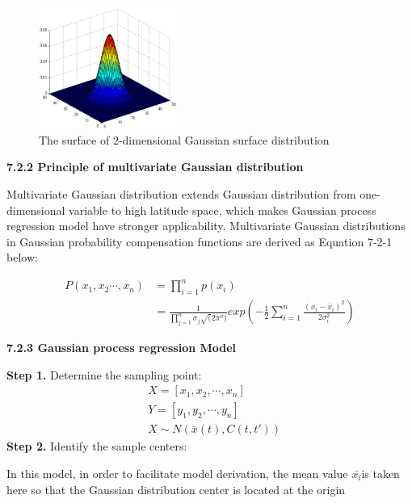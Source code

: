 \documentclass{apmcmthesis}
\begin{document}
		\begin{figure}[htbp!]
		\centering
		\includegraphics[height=4cm]{./figures/7-4.png}
		\caption{The surface of 2-dimensional Gaussian surface distribution
		}
	\end{figure}	
	
	\noindent\textbf{7.2.2 Principle of multivariate Gaussian distribution}
	
	Multivariate Gaussian distribution extends Gaussian distribution from one-dimensional variable to high latitude space, which makes Gaussian process regression model have stronger applicability. Multivariate Gaussian distributions in Gaussian probability compensation functions are derived as Equation 7-2-1 below:
	
	\begin{equation}
		\tag{7-2-1}
		\begin{split}
			P(x_{1},x_{2}\cdots,x_{n})& =\prod_{i=1}^{n}p(x_{i}) \\ &=\frac{1}{\prod_{j=1}^{n}\sigma_{j}\sqrt(2\pi^{\pi})}exp(-\frac{1}{2}\sum_{i=1}^{n}\frac{(x_{i}-\bar{x}_{i})^2}{2\sigma^2_{i}})
		\end{split}
	\end{equation}
	
	\noindent\textbf{7.2.3 Gaussian process regression Model}	
	
	\noindent\textbf{Step 1. }Determine the sampling point:
	\begin{equation}
		\tag{7-2-2}
		\begin{split}
			&X =\left[x_{1},x_{2},\cdots,x_{n}\right]	\\
			&Y=\left[y_{1},y_{2},\cdots,y_{n}\right]	\\
			&X\sim N(\bar{x}(t),C(t,t'))
		\end{split}
	\end{equation}
	\noindent\textbf{Step 2. }Identify the sample centers:
	
	In this model, in order to facilitate model derivation, the mean value $\bar{x_{i}}$is taken here so that the Gaussian distribution center is located at the origin
	
\end{document}
